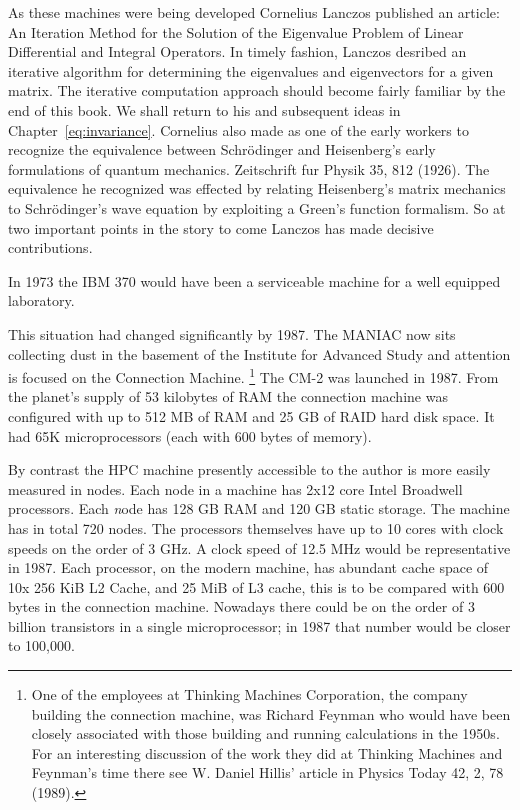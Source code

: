 As these machines were being developed Cornelius Lanczos published
an article: An Iteration Method for the Solution of the Eigenvalue Problem of Linear
Differential and Integral Operators\cite{lanczos50}. In timely fashion, Lanczos desribed 
an iterative algorithm for determining the eigenvalues and eigenvectors for a given
matrix. The iterative computation approach should become fairly
familiar by the end of this book. We shall return to his and subsequent ideas 
in Chapter~\ref{eq:invariance}. Cornelius also made as one of the early workers
to recognize the equivalence between Schr\"odinger and Heisenberg's early
formulations of quantum mechanics. Zeitschrift fur Physik 35, 812 (1926). The 
equivalence he recognized was effected by relating Heisenberg's matrix mechanics to
Schr\"odinger's wave equation by exploiting a Green's function formalism. 
So at two important points in the story to come Lanczos has made 
decisive contributions.

In 1973 the IBM 370 would have been a serviceable machine for a well equipped
laboratory.

This situation had changed significantly by 1987. The MANIAC now sits collecting dust in
the basement of the Institute for Advanced Study and attention 
is focused on the Connection Machine.
\footnote{One of the employees at Thinking Machines Corporation,
the company building the connection machine, was Richard Feynman
who would have been closely associated with those building and running
calculations in the 1950s. For an interesting discussion of the work they
did at Thinking Machines and Feynman's time there see W. Daniel
Hillis' article in Physics Today 42, 2, 78 (1989).}
The CM-2 was launched in 1987. From the planet's supply of 53 kilobytes of RAM
the connection machine was configured with up to 512 MB of RAM and 25 GB of RAID
hard disk space. It had 65K microprocessors (each with 600 bytes of memory). 

By contrast the HPC machine presently accessible to the author 
is more easily measured in nodes. Each node in a machine has 2x12 core Intel Broadwell processors.
Each {\emph node} has 128 GB RAM and 120 GB static storage. The machine has in total 720 nodes. 
The processors themselves have up to 10 cores with clock speeds 
on the order of 3 GHz. A clock speed of 12.5 MHz would be representative in 1987. 
Each processor, on the modern machine, has abundant cache 
space of 10x 256 KiB L2 Cache, and 25 MiB of L3 cache,
this is to be compared with 600 bytes in the connection machine. 
Nowadays there could be on the order of 3 billion 
transistors in a single microprocessor;
in 1987 that number would be closer to 100,000. 


